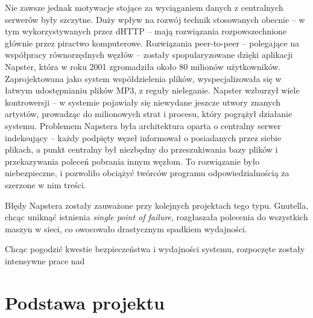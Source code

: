 Nie zawsze jednak motywacje stojące za wyciąganiem danych z centralnych serwerów były szczytne. Duży wpływ na rozwój technik stosowanych obecnie -- w tym wykorzystywanych przez dHTTP -- mają rozwiązania rozpowszechnione głównie przez piractwo komputerowe. Rozwiązania peer-to-peer -- polegające na współpracy równorzędnych węzłów -- zostały spopularyzowane dzięki aplikacji Napster, która w roku 2001 zgromadziła około 80 milionów użytkowników. Zaprojektowana jako system współdzielenia plików, wyspecjalizowała się w łatwym udostępnianiu plików MP3, z reguły nieleganie. Napster wzburzył wiele kontrowersji -- w systemie pojawiały się niewydane jeszcze utwory znanych artystów, prowadząc do milionowych strat i procesu, który pogrążył działanie systemu.
Problemem Napstera była architektura oparta o centralny serwer indeksujący -- każdy podpięty węzeł informował o posiadanych przez siebie plikach, a punkt centralny był niezbędny do przeszukiwania bazy plików i przekazywania poleceń pobrania innym węzłom. To rozwiązanie było niebezpieczne, i pozwoliło obciążyć twórców programu odpowiedzialnością za szerzone w nim treści.

Błędy Napstera zostały zauważone przy kolejnych projektach tego typu. Gnutella, chcąc uniknąć istnienia {\em single point of failure}, rozgłaszała polecenia do wszystkich maszyn w sieci, co owocowało drastycznym spadkiem wydajności.

Chcąc pogodzić kwestie bezpieczeństwa i wydajności systemu, rozpoczęte zostały intensywne prace nad 

\section{Podstawa projektu}
\label{sec:podstawaProjektu}
